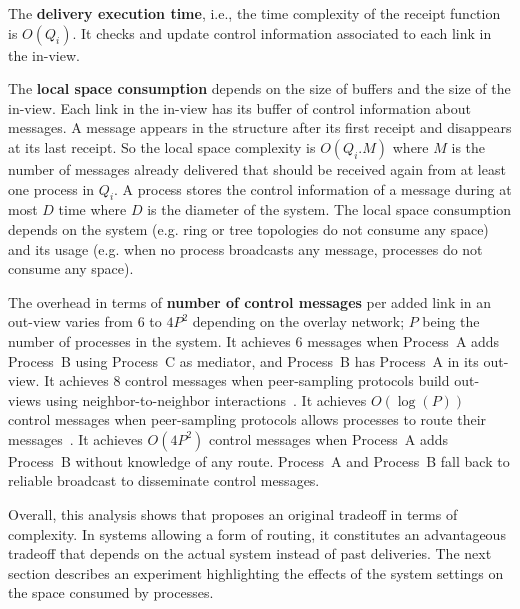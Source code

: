\noindent The \textbf{delivery execution time}, i.e., the time complexity of the
receipt function is $O(Q_i)$. It checks and update control information
associated to each link in the in-view.

\noindent The \textbf{local space consumption} depends on the size of buffers
and the size of the in-view. Each link in the in-view has its buffer of control
information about messages. A message appears in the structure after its first
receipt and disappears at its last receipt. So the local space complexity is
$O(Q_i.M)$ where $M$ is the number of messages already delivered that should be
received again from at least one process in $Q_i$. A process stores the control
information of a message during at most $D$ time where $D$ is the diameter of
the system. The local space consumption depends on the system (e.g. ring or tree
topologies do not consume any space) and its usage (e.g. when no process
broadcasts any message, processes do not consume any space).

\noindent The overhead in terms of \textbf{number of control messages} per added
link in an out-view varies from $6$ to $4P^2$ depending on the overlay network;
$P$ being the number of processes in the system. It achieves $6$ messages when
Process~A adds Process~B using Process~C as mediator, and Process~B has
Process~A in its out-view.  It achieves $8$ control messages when peer-sampling
protocols build out-views using neighbor-to-neighbor
interactions~\cite{jelasity2007gossip,nedelec2017adaptive}. It achieves
$O(\log(P))$ control messages when peer-sampling protocols allows processes to
route their messages~\cite{jelasity2009tman,stoica2001chord}.  It achieves
$O(4P^2)$ control messages when Process~A adds Process~B without knowledge of
any route. Process~A and Process~B fall back to reliable broadcast to
disseminate control messages.

Overall, this analysis shows that \RPCBROADCAST proposes an original tradeoff in
terms of complexity. In systems allowing a form of routing, it constitutes an
advantageous tradeoff that depends on the actual system instead of past
deliveries. The next section describes an experiment highlighting the effects of
the system settings on the space consumed by processes.

